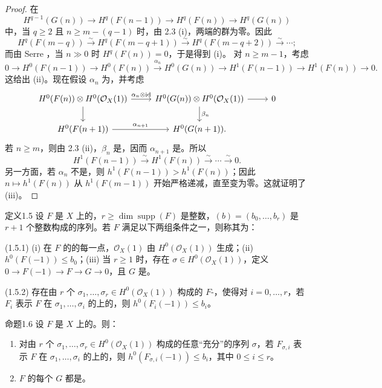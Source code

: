 \begin{proof}
在
\[H^{q-1}(G(n))\longrightarrow H^q(F(n-1))\longrightarrow H^q(F(n))\longrightarrow H^q(G(n))\]
中，当 $q\geq2$ 且 $n\geq m-(q-1)$ 时，由 2.3 (i)，两端的群为零。因此
\[H^q(F(m-q))\xrightarrow\sim H^q(F(m-q+1))\xrightarrow\sim H^q(F(m-q+2))\xrightarrow\sim\cdots;\]
而由 Serre ，当 $n\gg0$ 时 $H^q(F(n))=0$，于是得到 (i)。
对 $n\geq m-1$，考虑
\[0\to H^0(F(n-1))\to H^0(F(n))\xrightarrow{\alpha_n}H^0(G(n))\to H^1(F(n-1))\to H^1(F(n))\to0.\]
这给出 (ii)。现在假设 $\alpha_n$ 为，并考虑
\[
\begin{tikzcd}
H^0(F(n))\otimes H^0(\mathcal O_X(1))\arrow[r,"\alpha_n\otimes\mathrm{id}"]\arrow[d]
&H^0(G(n))\otimes H^0(\mathcal O_X(1))\arrow[r]\arrow[d,"\beta_n"]&0\\
H^0(F(n+1))\arrow[r,"\alpha_{n+1}"]&H^0(G(n+1)).
\end{tikzcd}
\]
若 $n\geq m$，则由 2.3 (ii)，$\beta_n$ 是，因而 $\alpha_{n+1}$ 是。所以
\[H^1(F(n-1))\xrightarrow\sim H^1(F(n))\xrightarrow\sim\cdots\xrightarrow\sim0.\]
另一方面，若 $\alpha_n$ 不是，则 $h^1(F(n-1))>h^1(F(n))$；因此 $n\mapsto h^1(F(n))$ 从 $h^1(F(m-1))$ 开始严格递减，直至变为零。这就证明了 (iii)。
\end{proof}
\begin{SGAresult}{定义}{1.5}
设 $F$ 是 $X$ 上的，$r\geq\dim\operatorname{supp}(F)$ 是整数，$(b)=(b_0,\ldots,b_r)$ 是 $r+1$ 个整数构成的序列。若 $F$ 满足以下两组条件之一，则称其为：

\textup{(1.5.1)} (i) 在 $F$ 的的每一点，$\mathcal O_X(1)$ 由 $H^0(\mathcal O_X(1))$ 生成；(ii) $h^0(F(-1))\leq b_0$；(iii) 当 $r\geq1$ 时，存在 $\sigma\in H^0(\mathcal O_X(1))$，定义 $0\to F(-1)\to F\to G\to0$，且 $G$ 是。

\textup{(1.5.2)} 存在由 $r$ 个 $\sigma_1,\ldots,\sigma_r\in H^0(\mathcal O_X(1))$ 构成的 $F$-，使得对 $i=0,\ldots,r$，若 $F_i$ 表示 $F$ 在 $\sigma_1,\ldots,\sigma_i$ 的上的，则 $h^0(F_i(-1))\leq b_i$。
\end{SGAresult}
\begin{SGAresult}{命题}{1.6}
设 $F$ 是 $X$ 上的。则：
\begin{enumerate}
\item[(i)] 对由 $r$ 个 $\sigma_1,\ldots,\sigma_r\in H^0(\mathcal O_X(1))$ 构成的任意“充分”的序列 $\sigma$，若 $F_{\sigma,i}$ 表示 $F$ 在 $\sigma_1,\ldots,\sigma_i$ 的上的，则 $h^0(F_{\sigma,i}(-1))\leq b_i$，其中 $0\leq i\leq r$。
\item[(ii)] $F$ 的每个 $G$ 都是。
\end{enumerate}
\end{SGAresult}
